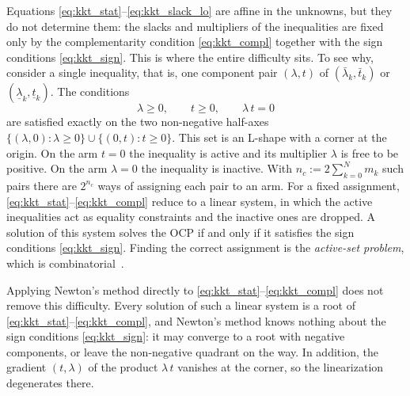 Equations \eqref{eq:kkt_stat}--\eqref{eq:kkt_slack_lo} are affine in the unknowns, but they do not determine them: the slacks and multipliers of the inequalities are fixed only by the complementarity condition \eqref{eq:kkt_compl} together with the sign conditions \eqref{eq:kkt_sign}.
This is where the entire difficulty sits.
To see why, consider a single inequality, that is, one component pair $(\lambda, t)$ of $(\bar{\lambda}_k, \bar{t}_k)$ or $(\underline{\lambda}_k, \underline{t}_k)$.
The conditions
\[
    \lambda \geq 0, \qquad t \geq 0, \qquad \lambda\, t = 0
\]
are satisfied exactly on the two non-negative half-axes $\{(\lambda, 0) : \lambda \geq 0\} \cup \{(0, t) : t \geq 0\}$.
This set is an L-shape with a corner at the origin.
On the arm $t = 0$ the inequality is active and its multiplier $\lambda$ is free to be positive.
On the arm $\lambda = 0$ the inequality is inactive.
With $n_c := 2\sum_{k=0}^{N} m_k$ such pairs there are $2^{n_c}$ ways of assigning each pair to an arm.
For a fixed assignment, \eqref{eq:kkt_stat}--\eqref{eq:kkt_compl} reduce to a linear system, in which the active inequalities act as equality constraints and the inactive ones are dropped.
A solution of this system solves the OCP if and only if it satisfies the sign conditions \eqref{eq:kkt_sign}.
Finding the correct assignment is the \textit{active-set problem}, which is combinatorial~\cite{ferreau2014qpoases}.

Applying Newton's method directly to \eqref{eq:kkt_stat}--\eqref{eq:kkt_compl} does not remove this difficulty.
Every solution of such a linear system is a root of \eqref{eq:kkt_stat}--\eqref{eq:kkt_compl}, and Newton's method knows nothing about the sign conditions \eqref{eq:kkt_sign}: it may converge to a root with negative components, or leave the non-negative quadrant on the way.
In addition, the gradient $(t, \lambda)$ of the product $\lambda\, t$ vanishes at the corner, so the linearization degenerates there.

